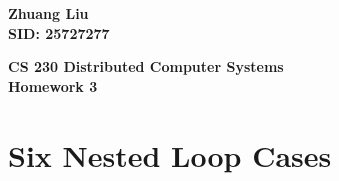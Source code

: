 \documentclass{article}%
\begin{document}
\begin{flushright}
\begin{LARGE}

\textbf{Zhuang Liu \\
SID: 25727277}
\end{LARGE}
\end{flushright}

\begin{center}
\begin{huge}
\textbf{CS 230 Distributed Computer Systems \\
Homework 3} \\
\end{huge}
\end{center}

\section{Six Nested Loop Cases}
\end{document}
